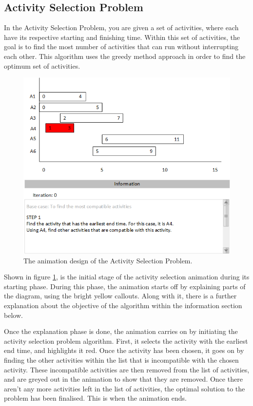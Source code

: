 \newpage

\subsection{Activity Selection Problem}

In the Activity Selection Problem, you are given a set of activities, where each have its respective starting and finishing time. Within this set of activities, the goal is to find the most number of activities that can run without interrupting each other. This algorithm uses the greedy method approach in order to find the optimum set of activities. 

\begin{figure}[H]
\centering
\includegraphics[scale=0.9]{images/report_images/animationDesignActivitySelectionProblem_STEP1.png}
\caption{The animation design of the Activity Selection Problem.}
\label{animationDesignActivitySelectionProblem}
\end{figure}

Shown in figure \ref{animationDesignActivitySelectionProblem}, is the initial stage of the activity selection animation during its starting phase. During this phase, the animation starts off by explaining parts of the diagram, using the bright yellow callouts. Along with it, there is a further explanation about the objective of the algorithm within the information section below.

Once the explanation phase is done, the animation carries on by initiating the activity selection problem algorithm. First, it selects the activity with the earliest end time, and highlights it red. Once the activity has been chosen, it goes on by finding the other activities within the list that is incompatible with the chosen activity. These incompatible activities are then removed from the list of activities, and are greyed out in the animation to show that they are removed. Once there aren't any more activities left in the list of activities, the optimal solution to the problem has been finalised. This is when the animation ends. 

